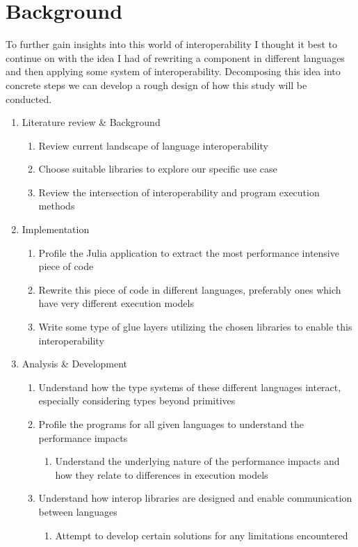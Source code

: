 \section{Background}\label{s:background}



To further gain insights into this world of interoperability I thought it best to continue on with the idea I had of rewriting a component in different languages and then applying some system of interoperability. Decomposing this idea into concrete steps we can develop a rough design of how this study will be conducted.
\begin{enumerate}
    \item Literature review \& Background
    \begin{enumerate}
        \item Review current landscape of language interoperability
        \item Choose suitable libraries to explore our specific use case
        \item Review the intersection of interoperability and program execution methods
    \end{enumerate}
    \item Implementation
    \begin{enumerate}
        \item Profile the Julia application to extract the most performance intensive piece of code
        \item Rewrite this piece of code in different languages, preferably ones which have very different execution models
        \item Write some type of glue layers utilizing the chosen libraries to enable this interoperability
    \end{enumerate}
    \item Analysis \& Development
    \begin{enumerate}
        \item Understand how the type systems of these different languages interact, especially considering types beyond primitives
        \item Profile the programs for all given languages to understand the performance impacts
        \begin{enumerate}
            \item Understand the underlying nature of the performance impacts and how they relate to differences in execution models
        \end{enumerate}
        \item Understand how interop libraries are designed and enable communication between languages
        \begin{enumerate}
            \item Attempt to develop certain solutions for any limitations encountered
        \end{enumerate}
    \end{enumerate}
\end{enumerate}

